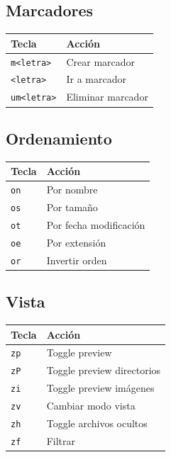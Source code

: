 \documentclass[
  doc,
  floatsintext,
  longtable,
  a4paper,
  nolmodern,
  notxfonts,
  notimes,
  12pt,
  colorlinks=true,linkcolor=blue,citecolor=blue,urlcolor=blue]{apa7}
\newcounter{none} %
\begin{document}
\subsection{Marcadores}\label{marcadores}

{\def\LTcaptype{none} %
\begin{longtable}[]{@{}ll@{}}
\toprule\noalign{}
Tecla & Acción \\
\midrule\noalign{}
\endhead
\bottomrule\noalign{}
\endlastfoot
\texttt{m\textless{}letra\textgreater{}} & Crear marcador \\
\texttt{\textquotesingle{}\textless{}letra\textgreater{}} & Ir a
marcador \\
\texttt{um\textless{}letra\textgreater{}} & Eliminar marcador \\
\end{longtable}
}

\subsection{Ordenamiento}\label{ordenamiento-1}

{\def\LTcaptype{none} %
\begin{longtable}[]{@{}ll@{}}
\toprule\noalign{}
Tecla & Acción \\
\midrule\noalign{}
\endhead
\bottomrule\noalign{}
\endlastfoot
\texttt{on} & Por nombre \\
\texttt{os} & Por tamaño \\
\texttt{ot} & Por fecha modificación \\
\texttt{oe} & Por extensión \\
\texttt{or} & Invertir orden \\
\end{longtable}
}

\subsection{Vista}\label{vista}

{\def\LTcaptype{none} %
\begin{longtable}[]{@{}ll@{}}
\toprule\noalign{}
Tecla & Acción \\
\midrule\noalign{}
\endhead
\bottomrule\noalign{}
\endlastfoot
\texttt{zp} & Toggle preview \\
\texttt{zP} & Toggle preview directorios \\
\texttt{zi} & Toggle preview imágenes \\
\texttt{zv} & Cambiar modo vista \\
\texttt{zh} & Toggle archivos ocultos \\
\texttt{zf} & Filtrar \\
\end{longtable}
}
\end{document}
